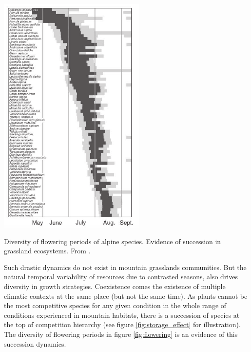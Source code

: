 \begin{marginfigure}
    \includegraphics{./1_Introduction/graphics/flowering_m.pdf}
  \caption[Flowering periods of alpine species]{Diversity of flowering periods of alpine species. Evidence of succession in grassland ecosystems. From \cite{korner_alpine_2003}.}
  \label{fig:flowering}
\end{marginfigure}

Such drastic dynamics do not exist in mountain grasslands communities. But the natural temporal variability of resources due to contrasted seasons, also drives diversity in growth strategies. Coexistence comes the existence of multiple climatic contexts at the same place (but not the same time). As plants cannot be the most competitive species for any given condition in the whole range of conditions experienced in mountain habitats, there is a succession of species at the top of competition hierarchy \parencite{adler_climate_2006} (see figure \ref{fig:storage_effect} for illustration). The diversity of flowering periods in figure \ref{fig:flowering} is an evidence of this succession dynamics.

